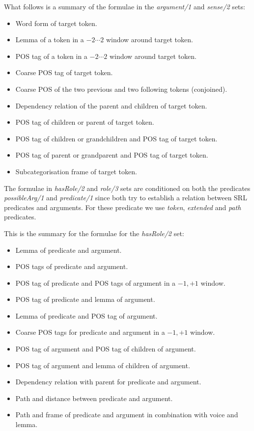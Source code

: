 What follows is a summary of the formulae in the \emph{argument/1} and 
\emph{sense/2} sets:
\begin{itemize}\addtolength{\itemsep}{-0.5\baselineskip}
    \item Word form of target token.
    \item Lemma of a token in a $-2 \cdots 2$ window around target token.
    \item POS tag of a token in a $-2 \cdots 2$ window around target token.
    \item Coarse POS tag of target token.
    \item Coarse POS of the two previous and two following tokens (conjoined).
    \item Dependency relation of the parent and children of target token.
    \item POS tag of children or parent of target token.
    \item POS tag of children or grandchildren and POS tag of target token.
    \item POS tag of parent or grandparent and POS tag of target token.
    \item Subcategorisation frame of target token.
\end{itemize}

The formulae in \emph{hasRole/2} and \emph{role/3} sets are conditioned on both 
the predicates \emph{possibleArg/1} and \emph{predicate/1} since both try 
to establish a relation between SRL predicates and arguments. For these predicate 
we use \emph{token}, \emph{extended} and \emph{path} predicates.

This is the summary for the formulae for the \emph{hasRole/2} set:
\begin{itemize}\addtolength{\itemsep}{-0.5\baselineskip}
    \item Lemma of predicate and argument.
    \item POS tags of predicate and argument.
    \item POS tag of predicate and POS tags of argument in a $-1,+1$ window.
    \item POS tag of predicate and lemma of argument.
    \item Lemma of predicate and POS tag of argument.
    \item Coarse POS tags for predicate and argument in a $-1,+1$ window.
    \item POS tag of argument and POS tag of children of argument.
    \item POS tag of argument and lemma  of children of argument.
    \item Dependency relation with parent for predicate and argument.
    \item Path and distance between predicate and argument.
    \item Path and frame of predicate and argument in combination with voice and 
        lemma.
\end{itemize}

